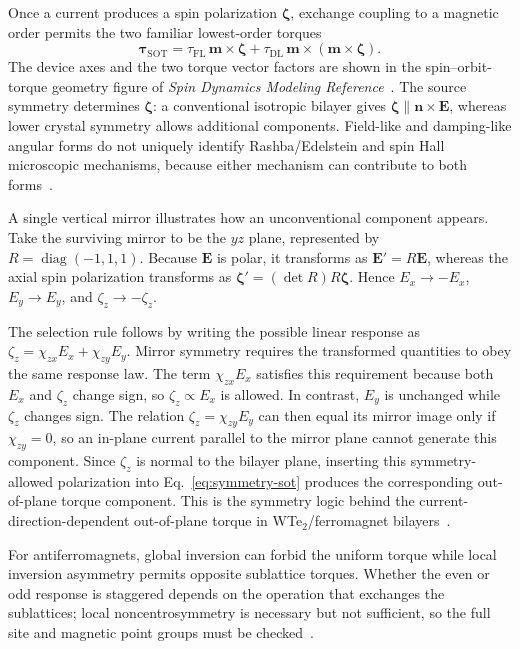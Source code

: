 Once a current produces a spin polarization $\boldsymbol{\zeta}$, exchange
coupling to a magnetic order permits the two familiar lowest-order torques
\begin{equation}
    \boldsymbol{\tau}_{\mathrm{SOT}}
    =\tau_{\mathrm{FL}}\,\mathbf{m}\times\boldsymbol{\zeta}
    +\tau_{\mathrm{DL}}\,\mathbf{m}\times
    (\mathbf{m}\times\boldsymbol{\zeta}).
    \label{eq:symmetry-sot}
\end{equation}
The device axes and the two torque vector factors are shown in the
spin--orbit-torque geometry figure of \emph{Spin Dynamics Modeling
Reference}~\cite{sot-stt-compact-model,kong2026spatially}.
The source symmetry determines $\boldsymbol{\zeta}$: a conventional isotropic
bilayer gives $\boldsymbol{\zeta}\parallel\mathbf{n}\times\mathbf{E}$,
whereas lower crystal symmetry allows additional components.  Field-like and
damping-like angular forms do not uniquely identify Rashba/Edelstein and spin
Hall microscopic mechanisms, because either mechanism can contribute to both
forms~\cite{manchon2019sot,zhang2024revisiting,xu2023field-free-afm}.

A single vertical mirror illustrates how an unconventional component appears.
Take the surviving mirror to be the $yz$ plane, represented by
$R=\operatorname{diag}(-1,1,1)$.  Because $\mathbf{E}$ is polar, it transforms
as $\mathbf{E}'=R\mathbf{E}$, whereas the axial spin polarization transforms as
$\boldsymbol{\zeta}'=(\det R)R\boldsymbol{\zeta}$.  Hence
$E_x\to-E_x$, $E_y\to E_y$, and $\zeta_z\to-\zeta_z$.

The selection rule follows by writing the possible linear response as
$\zeta_z=\chi_{zx}E_x+\chi_{zy}E_y$.  Mirror symmetry requires the transformed
quantities to obey the same response law.  The term $\chi_{zx}E_x$ satisfies
this requirement because both $E_x$ and $\zeta_z$ change sign, so
$\zeta_z\propto E_x$ is allowed.  In contrast, $E_y$ is unchanged while
$\zeta_z$ changes sign.  The relation $\zeta_z=\chi_{zy}E_y$ can then equal its
mirror image only if $\chi_{zy}=0$, so an in-plane current parallel to the
mirror plane cannot generate this component.  Since $\zeta_z$ is normal to the
bilayer plane, inserting this symmetry-allowed polarization into
Eq.~\eqref{eq:symmetry-sot} produces the corresponding out-of-plane torque
component.  This is the symmetry logic behind the current-direction-dependent
out-of-plane torque in WTe$_2$/ferromagnet bilayers~\cite{ee237-week11,
    macneill2017wte2,liu2020twod-sot}.

For antiferromagnets, global inversion can forbid the uniform torque while
local inversion asymmetry permits opposite sublattice torques.  Whether the
even or odd response is staggered depends on the operation that exchanges the
sublattices; local noncentrosymmetry is necessary but not sufficient, so the
full site and magnetic point groups must be checked~\cite{zelezny2017sot,
    watanabe2018afm-switching}.

